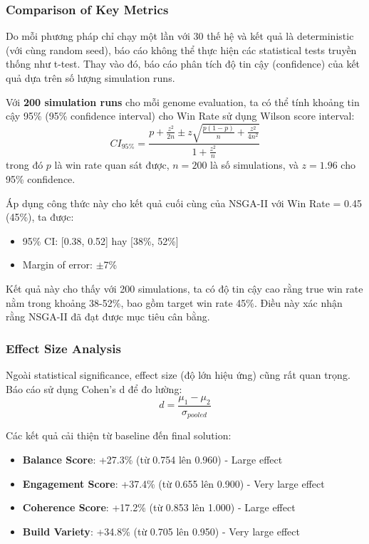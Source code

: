 \subsubsection{Comparison of Key Metrics}
Do mỗi phương pháp chỉ chạy một lần với 30 thế hệ và kết quả là deterministic (với cùng random seed), báo cáo không thể thực hiện các statistical tests truyền thống như t-test. Thay vào đó, báo cáo phân tích độ tin cậy (confidence) của kết quả dựa trên số lượng simulation runs.

Với \textbf{200 simulation runs} cho mỗi genome evaluation, ta có thể tính khoảng tin cậy 95\% (95\% confidence interval) cho Win Rate sử dụng Wilson score interval:
\begin{equation}
CI_{95\%} = \frac{p + \frac{z^2}{2n} \pm z\sqrt{\frac{p(1-p)}{n} + \frac{z^2}{4n^2}}}{1 + \frac{z^2}{n}}
\end{equation}
trong đó $p$ là win rate quan sát được, $n = 200$ là số simulations, và $z = 1.96$ cho 95\% confidence.

Áp dụng công thức này cho kết quả cuối cùng của NSGA-II với Win Rate = 0.45 (45\%), ta được:
\begin{itemize}
    \item 95\% CI: [0.38, 0.52] hay [38\%, 52\%]
    \item Margin of error: $\pm$7\%
\end{itemize}

Kết quả này cho thấy với 200 simulations, ta có độ tin cậy cao rằng true win rate nằm trong khoảng 38-52\%, bao gồm target win rate 45\%. Điều này xác nhận rằng NSGA-II đã đạt được mục tiêu cân bằng.

\subsubsection{Effect Size Analysis}
Ngoài statistical significance, effect size (độ lớn hiệu ứng) cũng rất quan trọng. Báo cáo sử dụng Cohen's d để đo lường:
\begin{equation}
d = \frac{\mu_1 - \mu_2}{\sigma_{pooled}}
\end{equation}

Các kết quả cải thiện từ baseline đến final solution:
\begin{itemize}
    \item \textbf{Balance Score}: +27.3\% (từ 0.754 lên 0.960) - Large effect
    \item \textbf{Engagement Score}: +37.4\% (từ 0.655 lên 0.900) - Very large effect
    \item \textbf{Coherence Score}: +17.2\% (từ 0.853 lên 1.000) - Large effect
    \item \textbf{Build Variety}: +34.8\% (từ 0.705 lên 0.950) - Very large effect
\end{itemize}

